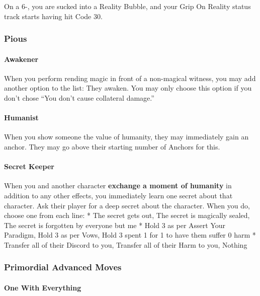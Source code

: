 \documentclass[
]{memoir}
\begin{document}
On a 6-, you are sucked into a Reality Bubble, and your Grip On Reality
status track starts having hit Code 30.

\hypertarget{pious}{%
\subsubsection{Pious}\label{pious}}

\hypertarget{awakener}{%
\paragraph{Awakener}\label{awakener}}

When you perform rending magic in front of a non-magical witness, you
may add another option to the list: They awaken. You may only choose
this option if you don't chose ``You don't cause collateral damage.''

\hypertarget{humanist}{%
\paragraph{Humanist}\label{humanist}}

When you show someone the value of humanity, they may immediately gain
an anchor. They may go above their starting number of Anchors for this.

\hypertarget{secret-keeper}{%
\paragraph{Secret Keeper}\label{secret-keeper}}

When you and another character \textbf{exchange a moment of humanity} in
addition to any other effects, you immediately learn one secret about
that character. Ask their player for a deep secret about the character.
When you do, choose one from each line: * The secret gets out, The
secret is magically sealed, The secret is forgotten by everyone but me *
Hold 3 as per Assert Your Paradigm, Hold 3 as per Vows, Hold 3 spent 1
for 1 to have them suffer 0 harm * Transfer all of their Discord to you,
Transfer all of their Harm to you, Nothing

\hypertarget{primordial-advanced-moves}{%
\subsubsection{Primordial Advanced
Moves}\label{primordial-advanced-moves}}

\hypertarget{one-with-everything}{%
\paragraph{One With Everything}\label{one-with-everything}}
\end{document}
